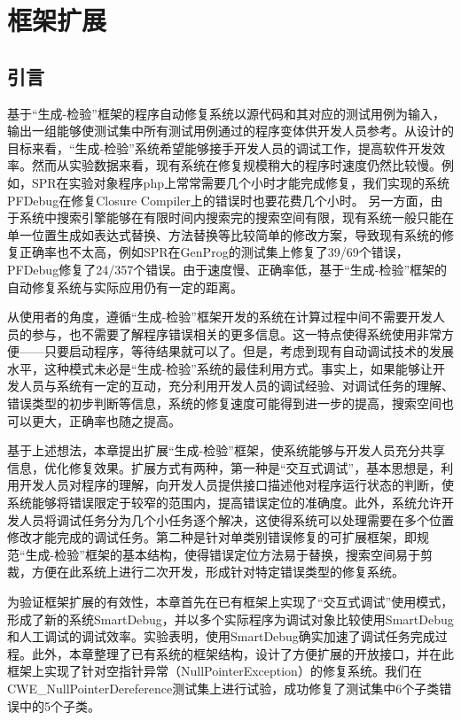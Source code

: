 \chapter{框架扩展}
\label{cha:ext}

\section{引言}%
基于“生成-检验”框架的程序自动修复系统以源代码和其对应的测试用例为输入，输出一组能够使测试集中所有测试用例通过的程序变体供开发人员参考。从设计的目标来看，“生成-检验”系统希望能够接手开发人员的调试工作，提高软件开发效率。然而从实验数据来看，现有系统在修复规模稍大的程序时速度仍然比较慢。例如，SPR在实验对象程序php上常常需要几个小时才能完成修复，我们实现的系统PFDebug在修复Closure Compiler上的错误时也要花费几个小时。
另一方面，由于系统中搜索引擎能够在有限时间内搜索完的搜索空间有限，现有系统一般只能在单一位置生成如表达式替换、方法替换等比较简单的修改方案，导致现有系统的修复正确率也不太高，例如SPR在GenProg的测试集上修复了39/69个错误，PFDebug修复了24/357个错误。由于速度慢、正确率低，基于“生成-检验”框架的自动修复系统与实际应用仍有一定的距离。

从使用者的角度，遵循“生成-检验”框架开发的系统在计算过程中间不需要开发人员的参与，也不需要了解程序错误相关的更多信息。这一特点使得系统使用非常方便——只要启动程序，等待结果就可以了。但是，考虑到现有自动调试技术的发展水平，这种模式未必是“生成-检验”系统的最佳利用方式。事实上，如果能够让开发人员与系统有一定的互动，充分利用开发人员的调试经验、对调试任务的理解、错误类型的初步判断等信息，系统的修复速度可能得到进一步的提高，搜索空间也可以更大，正确率也随之提高。

基于上述想法，本章提出扩展“生成-检验”框架，使系统能够与开发人员充分共享信息，优化修复效果。扩展方式有两种，第一种是“交互式调试”，基本思想是，利用开发人员对程序的理解，向开发人员提供接口描述他对程序运行状态的判断，使系统能够将错误限定于较窄的范围内，提高错误定位的准确度。此外，系统允许开发人员将调试任务分为几个小任务逐个解决，这使得系统可以处理需要在多个位置修改才能完成的调试任务。第二种是针对单类别错误修复的可扩展框架，即规范“生成-检验”框架的基本结构，使得错误定位方法易于替换，搜索空间易于剪裁，方便在此系统上进行二次开发，形成针对特定错误类型的修复系统。

为验证框架扩展的有效性，本章首先在已有框架上实现了“交互式调试”使用模式，形成了新的系统SmartDebug，并以多个实际程序为调试对象比较使用SmartDebug和人工调试的调试效率。实验表明，使用SmartDebug确实加速了调试任务完成过程。此外，本章整理了已有系统的框架结构，设计了方便扩展的开放接口，并在此框架上实现了针对空指针异常（NullPointerException）的修复系统。我们在CWE\_NullPointerDereference测试集上进行试验，成功修复了测试集中6个子类错误中的5个子类。

